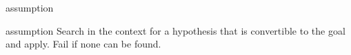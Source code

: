 \begin{tactic}{assumption}
  \begin{tsyntax}[empty]{assumption}
  Search in the context for a hypothesis that is convertible to the goal
  and apply. Fail if none can be found.
  \end{tsyntax}
\end{tactic}
